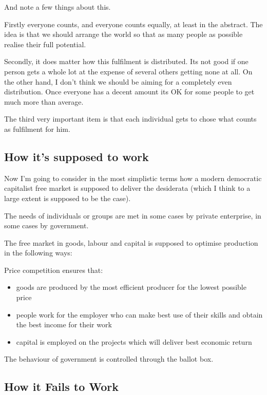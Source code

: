 And note a few things about this.

Firstly everyone counts, and everyone counts equally, at least in the abstract. 
The idea is that we should arrange the world so that as many people as possible realise their full potential.

Secondly, it does matter how this fulfilment is distributed.
Its not good if one person gets a whole lot at the expense of several others getting none at all.
On the other hand, I don't think we should be aiming for a completely even distribution.
Once everyone has a decent amount its OK for some people to get much more than average.

The third very important item is that each individual gets to chose what counts as fulfilment for him.


\subsection{How it's supposed to work}

Now I'm going to consider in the most simplistic terms how a modern democratic capitalist free market is supposed to deliver the desiderata (which I think to a large extent is supposed to be the case).

The needs of individuals or groups are met in some cases by private enterprise, in some cases by government.

The free market in goods, labour and capital is supposed to optimise production in the following ways:

Price competition ensures that:
 \begin{itemize}
   \item goods are produced by the most efficient producer for the lowest possible price
   \item people work for the employer who can make best use of their skills and obtain the best income for their work
   \item capital is employed on the projects which will deliver best economic return
 \end{itemize}

The behaviour of government is controlled through the ballot box.

\subsection{How it Fails to Work}

